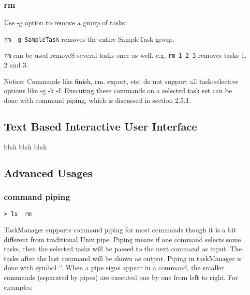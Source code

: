 \documentclass[12pt, a4paper]{article}
\begin{document}
\subsubsection{rm}
Use -g option to remove a group of tasks:

\texttt{rm -g SampleTask} removes the entire SampleTask group.

\texttt{rm} can be used removeS several tasks once as well. e.g. \texttt{rm 1 2 3} removes tasks 1, 2 and 3.


Notice: Commands like finish, rm, export, etc. do not support all task-selective options like -g -k -f.
Executing these commands on a selected task set can be done with command piping, which is discussed in section 2.5.1.

\subsection{Text Based Interactive User Interface}
blah blah blah

\subsection{Advanced Usages}
\subsubsection{command piping}

\texttt{\textgreater \ ls \textbar \  rm}

TaskManager supports command piping for most commands though it is a bit different from traditional Unix pipe.
Piping means if one command selects some tasks, then the selected tasks will be passed to the next command as input. The tasks after the last command will be shown as output.
Piping in taskManager is done with symbol `\textbar'. When a pipe signs appear in a command, the smaller commands (separated by pipes) are executed one by one from left to right. For examples:
\end{document}
